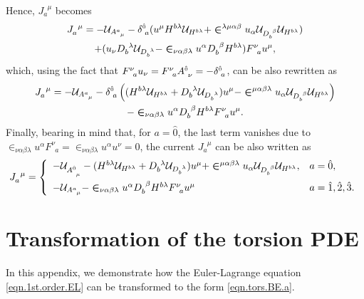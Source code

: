 \documentclass[
10pt, %
a4paper, %
oneside, %
headinclude,footinclude, %
BCOR5mm, %
]{scrartcl}
\newcommand{\itetr}[2]{F^{#1}_{\phantom{#1}#2}}
\newcommand{\tetr}[2]{A^{#1}_{\phantom{#1}#2}}
\newcommand{\eT}[2]{D_{#1}^{\phantom{#1}#2}}	%
\newcommand{\hT}[2]{H^{#1#2}}	%
\newcommand{\LagST}{\mathcal{U}}%
\newcommand{\LCsymb}{\bm{\in}}    %
\newcommand{\KD}[2]{\delta^{#1}_{\,\,#2}}
\newcommand{\NC}[2]{J^{\phantom{#1}#2}_{#1}}
\newcommand{\indlat}[1]{\hat{\mathsmaller{#1}}}
\begin{document}
Hence, $ \NC{a}{\mu} $ becomes
\begin{multline}
\NC{a}{\mu} =
-\LagST_{\tetr{a}{\mu}} 
- \KD{\indlat{0}}{a}
(u^\mu \hT{b}{\lambda} \LagST_{\hT{b}{\lambda}} + \LCsymb^{\lambda\mu\alpha\beta} u_\alpha 
\LagST_{\eT{b}{\beta}} \LagST_{\hT{b}{\lambda}}) \\
+ ( u_\nu \eT{b}{\lambda} \LagST_{\eT{b}{\lambda}} - 
\LCsymb_{\nu\alpha\beta\lambda}u^\alpha\eT{b}{\beta}\hT{b}{\lambda})\itetr{\nu}{a}u^\mu,
\end{multline}
which, using the fact that $ \itetr{\nu}{a}u_\nu = \itetr{\nu}{a} \tetr{\indlat{0}}{\nu} = 
-\KD{\indlat{0}}{a} $, can be also rewritten as
\begin{multline}\label{app.eqn.Noether2}
\NC{a}{\mu} = 
-\LagST_{\tetr{a}{\mu}} 
- \KD{\indlat{0}}{a}
\left((\hT{b}{\lambda} \LagST_{\hT{b}{\lambda}} 
+ \eT{b}{\lambda} \LagST_{\eT{b}{\lambda}} )u^\mu
- \LCsymb^{\mu\alpha\beta\lambda} u_\alpha 
\LagST_{\eT{b}{\beta}} \LagST_{\hT{b}{\lambda}} \right) \\ 
- \LCsymb_{\nu\alpha\beta\lambda}u^\alpha\eT{b}{\beta}\hT{b}{\lambda}\itetr{\nu}{a}u^\mu.
\end{multline}
Finally, bearing in mind that, for $ a=\hat{0} $, the last term vanishes due to $ 
\LCsymb_{\nu\alpha\beta\lambda}u^\alpha\itetr{\nu}{a} =  
\LCsymb_{\nu\alpha\beta\lambda}u^\alpha u^\nu = 0$, the current $ \NC{a}{\mu} $ can be also written 
as
\begin{equation}
	\NC{a}{\mu} = \left\{
	\begin{array}{ll}
	-\LagST_{\tetr{\indlat{0}}{\mu}} 
	- (\hT{b}{\lambda} \LagST_{\hT{b}{\lambda}} 
	+ \eT{b}{\lambda} \LagST_{\eT{b}{\lambda}} )u^\mu
	+ \LCsymb^{\mu\alpha\beta\lambda} u_\alpha 
	\LagST_{\eT{b}{\beta}} \LagST_{\hT{b}{\lambda}},	& a=\hat{0},  \\[3mm] 
	-\LagST_{\tetr{a}{\mu}}	
	- \LCsymb_{\nu\alpha\beta\lambda}u^\alpha\eT{b}{\beta}\hT{b}{\lambda}\itetr{\nu}{a}u^\mu & a = 
	\hat{1},\hat{2},\hat{3}. \\ 
	\end{array} 
	\right.
\end{equation}

\section{Transformation of the torsion PDE}\label{app.sec.Deqn}

In this appendix, we demonstrate how the Euler-Lagrange equation \eqref{eqn.1st.order.EL} can be 
transformed to the form \eqref{eqn.tors.BE.a}.
\end{document}
